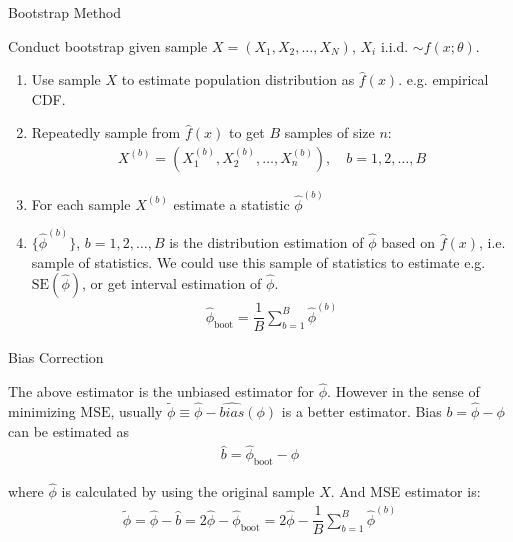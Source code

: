 \begin{point}
    Bootstrap Method
\end{point}

    Conduct bootstrap given sample $ X=(X_{1},X_{2},\ldots,X_{N})  $, $ X_i $ i.i.d. $ \sim f(x;\theta ) $.

\begin{enumerate}[topsep=2pt,itemsep=0pt]
    \item Use sample $ X $ to estimate population distribution as $ \hat{f}(x) $. e.g. empirical CDF.
    \item Repeatedly sample from $ \hat{f}(x) $ to get $ B $ samples of size $ n $:
    \begin{align}
        X^{(b)}=(X^{(b)}_{1},X^{(b)}_{2},\ldots,X^{(b)}_{n})  ,\quad b=1,2,\ldots,B
    \end{align}
    \item For each sample $ X^{(b)} $ estimate a statistic $ \hat{\phi }^{(b)} $
    \item $\{ \hat{\phi }^{(b)} \}$, $ b=1,2,\ldots,B $ is the distribution estimation of $ \hat{\phi} $ based on $ \hat{f}(x) $, i.e. sample of statistics. We could use this sample of statistics to estimate e.g. $ \mathrm{SE}(\hat{\phi})  $, or get interval estimation of $ \hat{\phi } $.
    \begin{align}
        \hat{\phi }_\mathrm{boot} =\dfrac{1}{B}\sum_{b=1}^B\hat{\phi}^{(b)} 
    \end{align}
    
    
\end{enumerate}

    
\begin{point}
    Bias Correction
\end{point}

    The above estimator is the unbiased estimator for $ \hat{\phi } $. However in the sense of minimizing $ \mathrm{MSE}  $, usually $ \tilde{\phi }\equiv \hat{\phi}-\hat{bias}(\phi) $ is a better estimator. Bias $ b=\hat{\phi }-\phi  $ can be estimated as
    \begin{align}
         \hat{b}=\hat{\phi }_\mathrm{boot}-\hat{\phi } 
    \end{align}
    
    where $ \hat{\phi } $ is calculated by using the original sample $ X $. And MSE estimator is:
    \begin{align}
        \tilde{\phi }= \hat{\phi }-\hat{b}=2\hat{\phi }-\hat{\phi }_\mathrm{boot}=2\hat{\phi }-\dfrac{1}{B}\sum_{b=1}^B\hat{\phi }^{(b)} 
    \end{align}
    
